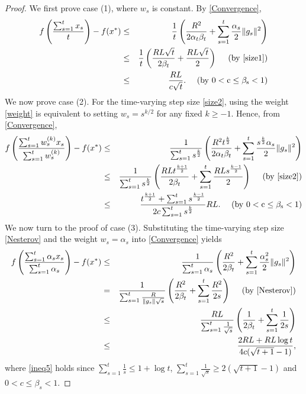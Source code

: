 \documentclass[sn-mathphys]{JORSC-jnl}%
\theoremstyle{thmstyleone}%
\theoremstyle{thmstylethree}%
\begin{document}
\begin{proof}
	We first prove case (1), where $w_s$ is constant. By \eqref{Convergence},
	\begin{eqnarray}
		f\left(\frac{\sum_{s=1}^t x_s}{t}\right)-f(x^*) 
		&\leq& \frac{1}{t}\left(\frac{R^2}{2\alpha_t\beta_t}+\sum_{s=1}^{t}\frac{\alpha_s}{2}\Vert g_s \Vert^2\right)\nonumber\\
	    &\leq&\frac{1}{t}\left(\frac{RL\sqrt{t}}{2\beta_t}+\frac{RL\sqrt{t}}{2}\right)~~~~({\rm by~ \eqref{size1}})\nonumber\\
		&\leq& \frac{RL}{c\sqrt{t}}.~~~~({\rm by~ 0 < c \leq \beta_s <1})\nonumber
	\end{eqnarray}
	We now prove case (2). For the time-varying step size \eqref{size2}, using the weight \eqref{weight} is equivalent to setting $w_s = s^{k/2}$ for any fixed $k \geq -1$. Hence, from \eqref{Convergence},
	\begin{eqnarray}
		f\left( \frac{\sum_{s=1}^t w_s^{(k)} x_s}{\sum_{s=1}^t w_s^{(k)}} \right) - f(x^*)
		&\leq& \frac{1}{\sum_{s=1}^{t} s^{\frac{k}{2}}}\left(\frac{R^2 t^{\frac{k}{2}}}{2\alpha_t\beta_t}+\sum_{s=1}^{t}\frac{s^{\frac{k}{2}}\alpha_s}{2}\Vert g_s \Vert^2\right)\nonumber\\
		&\leq&\frac{1}{\sum_{s=1}^{t} s^{\frac{k}{2}}}\left(\frac{RL t^{\frac{k+1}{2}}}{2\beta_t}+\sum_{s=1}^{t}\frac{RLs^{\frac{k-1}{2}}}{2}\right)~~~~({\rm by~ \eqref{size2}})\nonumber\\
		&\leq& \frac{t^{\frac{k+1}{2}} +\sum_{s=1}^{t} s^{\frac{k-1}{2}}}{2c\sum_{s=1}^{t} s^{\frac{k}{2}}} RL.~~~~({\rm by~ 0 < c \leq \beta_s <1})\nonumber
	\end{eqnarray}
	We now turn to the proof of case (3). Substituting the time-varying step size \eqref{Nesterov} and the weight $w_s = \alpha_s$ into \eqref{Convergence} yields
	\begin{eqnarray}
		f\left(\frac{\sum_{s=1}^t \alpha_s x_s}{\sum_{s=1}^t \alpha_s}\right)-f(x^*)
		&\leq& \frac{1}{\sum_{s=1}^{t} \alpha_s}\left(\frac{R^2}{2\beta_t}+\sum_{s=1}^{t}\frac{\alpha_s^2}{2}\Vert g_s \Vert^2\right)\nonumber\\
		&=& \frac{1}{\sum_{s=1}^{t} \frac{R}{\|g_s\|\sqrt{s}}}\left(\frac{R^2}{2\beta_t}+\sum_{s=1}^{t}\frac{R^2}{2s}\right)~~~~({\rm by~ \eqref{Nesterov}})\nonumber\\
		&\leq& \frac{RL}{\sum_{s=1}^{t} \frac{1}{\sqrt{s}}}\left(\frac{1}{2\beta_t}+\sum_{s=1}^{t}\frac{1}{2s}\right)\nonumber\\
		&\leq& \frac{2RL+RL\log t}{4c(\sqrt{t+1}-1)}, \label{ineq5}
	\end{eqnarray}
	where \eqref{ineq5} holds since $\sum_{s=1}^{t}\frac{1}{s} \le 1 + \log t$, $\sum_{s=1}^{t} \frac{1}{\sqrt{s}} \geq 2(\sqrt{t+1}-1)$ and $0 < c \leq \beta_s <1$.
	

\end{proof}
\end{document}
